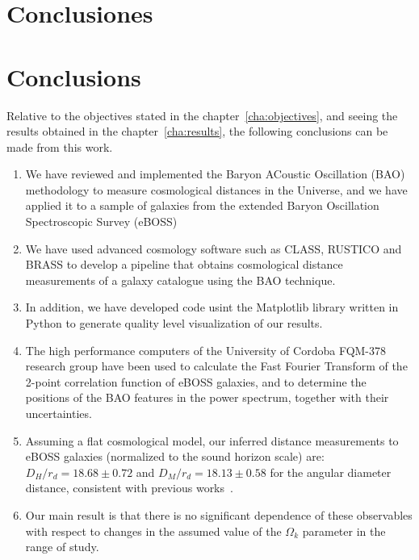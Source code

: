 \chapter*{Conclusiones}


\chapter*{Conclusions}

Relative to the objectives stated in the chapter~\ref{cha:objectives}, and seeing the results obtained in the chapter~\ref{cha:results}, the following conclusions can be made from this work.

\begin{enumerate}
	\item We have reviewed and implemented the Baryon ACoustic Oscillation (BAO) methodology to measure cosmological distances in the Universe, and we have applied it to a sample of galaxies from the extended Baryon Oscillation Spectroscopic Survey (eBOSS)
	\item We have used advanced cosmology software such as CLASS, RUSTICO and BRASS to develop a pipeline that obtains cosmological distance measurements of a galaxy catalogue using the BAO technique.
	\item In addition, we have developed code usint the Matplotlib library written in Python to generate quality level visualization of our results.
	\item The high performance computers of the University of Cordoba FQM-378 research group have been used to calculate the Fast Fourier Transform of the 2-point correlation function of eBOSS galaxies, and to determine the positions of the BAO features in the power spectrum, together with their uncertainties.
	\item Assuming a flat cosmological model, our inferred distance measurements to eBOSS galaxies (normalized to the sound horizon scale) are: $D_H/r_d = 18.68 \pm 0.72$ and $D_M/r_d = 18.13 \pm 0.58$ for the angular diameter distance, consistent with previous works~\cite{hector}.
	\item Our main result is that there is no significant dependence of these observables with respect to changes in the assumed value of the $\Omega_k$ parameter in the range of study.
\end{enumerate}

